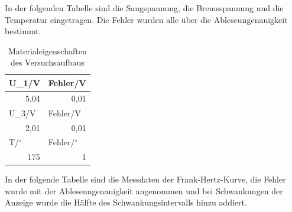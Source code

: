 \documentclass[12pt,a4paper]{article}
\begin{document}
In der folgenden Tabelle sind die Saugspannung, die Bremsspannung und die Temperatur eingetragen. Die Fehler wurden alle über die Ableseungenauigkeit bestimmt.

\begin{table}[htbp]
\caption{Materialeigenschaften des Versuchsaufbaus}
\begin{center}
\begin{tabular}{|l|l|}
\hline
U\_1/V & Fehler/V \\ \hline
\multicolumn{1}{|r|}{5,04} & \multicolumn{1}{r|}{0,01} \\ \hline
U\_3/V & Fehler/V \\ \hline
\multicolumn{1}{|r|}{2,01} & \multicolumn{1}{r|}{0,01} \\ \hline
T/$^\circ$ & Fehler/$^\circ$ \\ \hline
\multicolumn{1}{|r|}{175} & \multicolumn{1}{r|}{1} \\ \hline
\end{tabular}
\end{center}
\label{tab:eingenschaften}
\end{table}

In der folgende Tabelle sind die Messdaten der Frank-Hertz-Kurve, die Fehler wurde mit der Ableseungenauigkeit angenommen und bei Schwankungen der Anzeige wurde die Hälfte des Schwankungsintervalls hinzu addiert.
\end{document}
